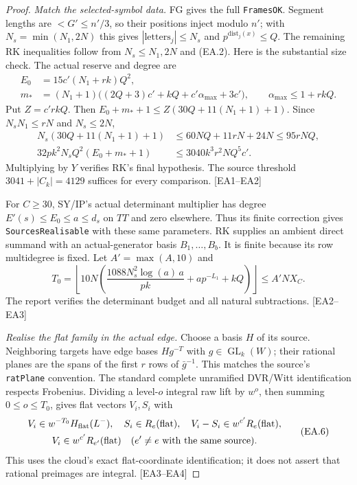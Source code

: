 \begin{proof}
\emph{Match the selected-symbol data.}
FG gives the full \texttt{FramesOK}. Segment lengths are $<G'\le n'/3$,
so their positions inject modulo $n'$; with $N_s=\min(N_1,2N)$ this gives
$|\mathrm{letters}_j|\le N_s$ and $p^{\mathrm{dist}_j(x)}\le Q$.
The remaining RK inequalities follow from $N_s\le N_1,2N$ and (EA.2).
Here is the substantial size check. The actual reserve and degree are
\[
\begin{aligned}
 E_0&=15c'(N_1+rk)Q^2,\\
 m_*&=(N_1+1)\bigl((2Q+3)c'+kQ+c'\alpha_{\max}+3c'\bigr),
 \qquad\alpha_{\max}\le1+rkQ.
\end{aligned}
\]
Put $Z=c'rkQ$. Then $E_0+m_*+1\le Z(30Q+11(N_1+1)+1)$.
Since $N_sN_1\le rN$ and $N_s\le2N$,
\[
\begin{split}
 N_s(30Q+11(N_1+1)+1)&\le60NQ+11rN+24N\le95rNQ,\\
 32pk^2N_sQ^2(E_0+m_*+1)&\le3040k^3r^2NQ^5c'.
\end{split}\tag{EA.4}
\]
Multiplying by $Y$ verifies RK's final hypothesis. The source threshold
$3041+|C_k|=4129$ suffices for every comparison. \textsf{[EA1--EA2]}

For $C\ge30$, SY/IP's actual determinant multiplier has degree
$E'(s)\le E_0\le a\le d_s$ on $TT$ and zero elsewhere. Thus its finite
correction gives \texttt{SourcesRealisable} with these same parameters.
RK supplies an ambient direct summand with an actual-generator basis
$B_1,\ldots,B_b$. It is finite because its row multidegree is fixed.
Let $A'=\max(A,10)$ and
\[
 T_0=\left\lfloor10N
 \left(\frac{1088N_s^2\log(a)\,a}{pk}+ap^{-L_1}+kQ\right)\right\rfloor
 \le A'NX_C.
 \tag{EA.5}
\]
The report verifies the determinant budget and all natural subtractions.
\textsf{[EA2--EA3]}

\emph{Realise the flat family in the actual edge.}
Choose a basis $H$ of its source. Neighboring targets have edge bases
$Hg^{-T}$ with $g\in\operatorname{GL}_k(W)$; their rational planes are
the spans of the first $r$ rows of $\bar g^{-1}$. This matches the source's
\texttt{ratPlane} convention. The standard complete unramified DVR/Witt
identification respects Frobenius. Dividing a level-$o$ integral raw lift
by $w^o$, then summing $0\le o\le T_0$, gives flat vectors $V_i,S_i$ with
\[
\begin{gathered}
 V_i\in w^{-T_0}H_{\rm flat}(L^-),\quad S_i\in R_e(\mathrm{flat}),
 \quad V_i-S_i\in w^{c'}R_e(\mathrm{flat}),\\
 V_i\in w^{c'}R_{e'}(\mathrm{flat})
 \quad(e'\ne e\text{ with the same source}).
\end{gathered}\tag{EA.6}
\]
This uses the cloud's exact flat-coordinate identification; it does not
assert that rational preimages are integral. \textsf{[EA3--EA4]}


\end{proof}
